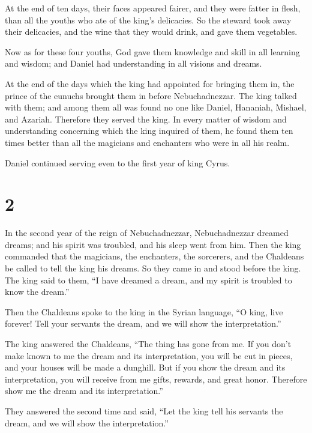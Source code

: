  At the end of ten days, their faces appeared fairer, and
they were fatter in flesh, than all the youths who ate of the king's
delicacies.  So the steward took away their delicacies, and
the wine that they would drink, and gave them vegetables.

 Now as for these four youths, God gave them knowledge and
skill in all learning and wisdom; and Daniel had understanding in all
visions and dreams.

 At the end of the days which the king had appointed for
bringing them in, the prince of the eunuchs brought them in before
Nebuchadnezzar.  The king talked with them; and among them
all was found no one like Daniel, Hananiah, Mishael, and Azariah.
Therefore they served the king.  In every matter of wisdom
and understanding concerning which the king inquired of them, he found
them ten times better than all the magicians and enchanters who were in
all his realm.

 Daniel continued serving even to the first year of king
Cyrus.

\hypertarget{section-1}{%
\section{2}\label{section-1}}

 In the second year of the reign of Nebuchadnezzar,
Nebuchadnezzar dreamed dreams; and his spirit was troubled, and his
sleep went from him.  Then the king commanded that the
magicians, the enchanters, the sorcerers, and the Chaldeans be called to
tell the king his dreams. So they came in and stood before the king.
 The king said to them, ``I have dreamed a dream, and my
spirit is troubled to know the dream.''

 Then the Chaldeans spoke to the king in the Syrian
language, ``O king, live forever! Tell your servants the dream, and we
will show the interpretation.''

 The king answered the Chaldeans, ``The thing has gone from
me. If you don't make known to me the dream and its interpretation, you
will be cut in pieces, and your houses will be made a dunghill.
 But if you show the dream and its interpretation, you will
receive from me gifts, rewards, and great honor. Therefore show me the
dream and its interpretation.''

 They answered the second time and said, ``Let the king tell
his servants the dream, and we will show the interpretation.''

